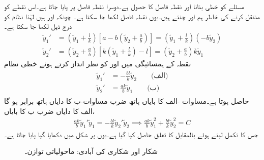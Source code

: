  مسئلے کو خطی بنانا اور نقطہ فاصل  کا حصول  ہے۔دوسرا نقطہ فاصل  پر پایا جاتا ہے۔اس نقطے  کو  منتقل کرنے کی خاطر ہم  اور  چنتے ہیں۔یوں نقطہ فاصل  لکھا جا سکتا ہے۔ چونکہ  اور  ہیں لہٰذا نظام  کو درج ذیل لکھا جا سکتا ہے۔
\begin{align*}
\tilde{y}_1'&=\left(\tilde{y}_1+\frac{l}{k}\right)\left[a-b\left(\tilde{y}_2+\frac{a}{b}\right)\right]=\left(\tilde{y}_1+\frac{l}{k}\right)(-b\tilde{y}_2)\\
\tilde{y}_2'&=\left(\tilde{y}_2+\frac{a}{b}\right)\left[k\left(\tilde{y}_1+\frac{l}{k}\right)-l\right]=\left(\tilde{y}_2+\frac{a}{b}\right)k\tilde{y}_1
\end{align*}
نقطہ  کے ہمسائیگی میں  اور  کو نظر انداز کرتے ہوئے خطی نظام
\begin{gather}\label{مثال_نظام_شکار_شکاری_ب}
\begin{aligned}
\tilde{y}_1'&=-\frac{bl}{k}\tilde{y}_2\quad \quad \text{(الف)}\\
\tilde{y}_2'&=\frac{ak}{b}\tilde{y}_1\quad \quad \text{(ب)}
\end{aligned}
\end{gather}
حاصل ہوتا ہے۔مساوات -الف کا بایاں ہاتھ ضرب مساوات-ب کا دایاں ہاتھ برابر ہو گا الف کا دایاں ضرب ب کا بایاں،
\begin{align*}
\frac{ak}{b}\tilde{y}_1'\tilde{y}_1=-\frac{bl}{k}\tilde{y}_2'\tilde{y}_2 \implies \frac{ak}{b}\tilde{y}_1^2+\frac{bl}{k}\tilde{y}_2^2=C
\end{align*}
جس کا تکمل لیتے ہوئے  بالمقابل  کا  تعلق حاصل کیا گیا ہے۔یوں  پر شکل  میں دکھایا گیا  پایا جاتا ہے۔
\begin{figure}
\centering
{}
\caption{شکار اور شکاری کی آبادی: ماحولیاتی توازن۔}
\label{شکل_مثال_نظام_شکار_شکاری}
\end{figure}


